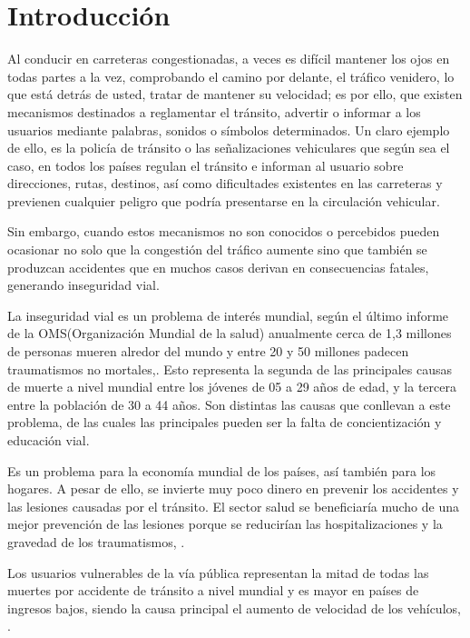 \chapter{Introducción}
	\setcounter{page}{1}
	Al conducir en carreteras congestionadas, a veces es difícil mantener los ojos en todas partes a la vez, comprobando el camino por delante, el tráfico venidero, lo que está detrás de usted, tratar de mantener su velocidad; es por ello, que existen mecanismos destinados a reglamentar el tránsito, advertir o informar a los usuarios mediante palabras, sonidos o símbolos determinados. Un claro ejemplo de ello, es la policía de tránsito o las señalizaciones vehiculares que según sea el caso, en todos los países regulan el tránsito e informan al usuario sobre direcciones, rutas, destinos, así como dificultades existentes en las carreteras y previenen cualquier peligro que podría presentarse en la circulación vehicular.

	\vskip 0.15cm
	Sin embargo, cuando estos mecanismos no son conocidos o percebidos pueden ocasionar no solo que la congestión del tráfico aumente sino que también se produzcan accidentes que en muchos casos derivan en consecuencias fatales, generando inseguridad vial.

	\vskip 0.15cm
	La inseguridad vial es un problema de interés mundial, según el último informe de la OMS(Organización Mundial de la salud) anualmente cerca de 1,3 millones de personas mueren alredor del mundo y entre 20 y 50 millones padecen traumatismos no mortales,\citep{OMS}. Esto representa la segunda de las principales causas de muerte a nivel mundial entre los jóvenes de 05 a 29 años de edad, y la tercera entre la población de 30 a 44 años. Son distintas las causas que conllevan a este problema, de las cuales las principales pueden ser la falta de concientización y educación vial. 
	
	\vskip 0.15cm	
	Es un problema para la economía mundial de los países, así también para los hogares. A pesar de ello, se invierte muy poco dinero en prevenir los accidentes y las lesiones causadas por el tránsito. El sector salud se beneficiaría mucho de una mejor prevención de las lesiones porque se reducirían las hospitalizaciones y la gravedad de los traumatismos, \citep{CNSV}.

	\vskip 0.15cm
	Los usuarios vulnerables de la vía pública representan la mitad de todas las muertes por accidente de tránsito a nivel mundial y es mayor en países de ingresos bajos, siendo la causa principal el aumento de velocidad de los vehículos, \citep{OMS}.

